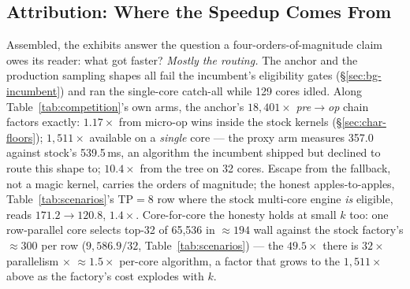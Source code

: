\subsection{Attribution: Where the Speedup Comes From}
\label{sec:eval-attribution}

Assembled, the exhibits answer the question a four-orders-of-magnitude
claim owes its reader: what got faster? \emph{Mostly the routing.} The
anchor and the production sampling shapes all fail the incumbent's
eligibility gates (\S\ref{sec:bg-incumbent}) and ran the single-core
catch-all while 129 cores idled. Along Table~\ref{tab:competition}'s
own arms, the anchor's $18{,}401\times$ \emph{pre}$\to$\emph{op} chain
factors exactly: $1.17\times$ from micro-op wins inside the stock
kernels (\S\ref{sec:char-floors}); $1{,}511\times$ available on a
\emph{single} core --- the proxy arm
measures 357.0\us{} against stock's 539.5\,ms, an algorithm
the incumbent shipped but declined to route this shape to;
$10.4\times$ from the tree on 32 cores. Escape from the fallback, not a
magic kernel, carries the orders of magnitude; the honest
apples-to-apples, Table~\ref{tab:scenarios}'s TP${=}8$ row where the
stock multi-core engine \emph{is} eligible, reads
$171.2 \to 120.8$\us{}, $1.4\times$. Core-for-core the honesty holds
at small $k$ too: one row-parallel core selects top-32 of 65,536 in
${\approx}194$\us{} wall against the stock factory's ${\approx}300$\us{}
per row ($9{,}586.9/32$, Table~\ref{tab:scenarios}) --- the $49.5\times$
there is $32\times$ parallelism $\times$ ${\approx}1.5\times$ per-core
algorithm, a factor that grows to the $1{,}511\times$ above as the
factory's cost explodes with $k$.

